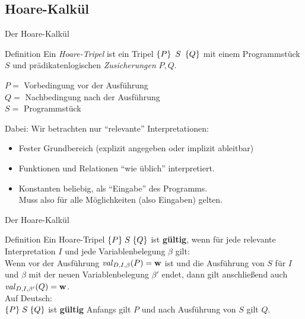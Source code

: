 \subsection{Hoare-Kalkül}
\begin{frame}{Der Hoare-Kalkül}
	\begin{block}{Definition}
		Ein \emph{Hoare-Tripel} ist ein Tripel $\left\{P\right\}\ S \ \left\{Q\right\}$ mit einem Programmstück $S$ und prädikatenlogischen \emph{Zusicherungen} $P,Q$.
	\end{block}
	\pause
	$P = $ Vorbedingung vor der Ausführung \\
	$Q = $ Nachbedingung nach der Ausführung\\
	$S = $ Programmstück
	
	\pause
	\bigskip
	Dabei: Wir betrachten nur \enquote{relevante} Interpretationen:
	\begin{itemize}[<+->]
		\item Fester Grundbereich (explizit angegeben oder implizit ableitbar)
		\item Funktionen und Relationen \enquote{wie üblich} interpretiert.
		\item Konstanten beliebig, als \enquote{Eingabe} des Programms.\\
		Muss also für alle Möglichkeiten (also Eingaben) gelten.
	\end{itemize}
\end{frame}

\begin{frame}{Der Hoare-Kalkül}
	\begin{block}{Definition}
		Ein Hoare-Tripel $\{P\}\;S\; \{Q\}$ ist \textbf{gültig}, wenn für jede relevante Interpretation $I$ und jede Variablenbelegung $\beta$ gilt:\\
		Wenn vor der Ausführung $\hbox{\textit{val}}_{D,I,\beta}(P)=\hbox{\textbf{w}}$ ist und die Ausführung von $S$ für $I$ und $\beta$ mit der neuen Variablenbelegung $\beta'$ endet, dann gilt anschließend auch $\hbox{\textit{val}}_{D,I,\beta'}(Q)=\hbox{\textbf{w}}$. \\
		\medskip
		Auf Deutsch: \\
		$\{P\}\;S\; \{Q\}$ ist \textbf{gültig} \Gdw Anfangs gilt $P$ und nach Ausführung von $S$ gilt $Q$.
	\end{block}
\end{frame}

